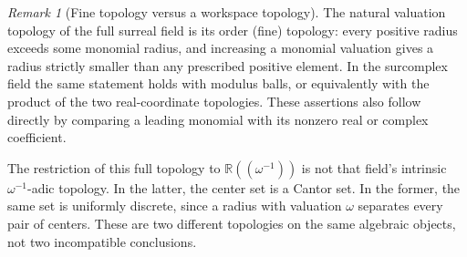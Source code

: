 \documentclass[11pt,a4paper]{article}
\numberwithin{equation}{section}
\theoremstyle{plain}
\theoremstyle{definition}
\theoremstyle{remark}
\newtheorem{remark}[remark]{Remark}
\newcommand{\R}{\mathbb R}
\begin{document}
\begin{remark}[Fine topology versus a workspace topology]\label{epd:rem:fine-vs-workspace}
The natural valuation topology of the full surreal field is its order
(fine) topology: every positive radius exceeds some monomial radius,
and increasing a monomial valuation gives a radius strictly smaller
than any prescribed positive element. In the surcomplex field the
same statement holds with modulus balls, or equivalently with the
product of the two real-coordinate topologies. These assertions also
follow directly by comparing a leading monomial with its nonzero real
or complex coefficient.

The restriction of this full topology to $\R((\omega^{-1}))$ is not
that field's intrinsic $\omega^{-1}$-adic topology. In the latter, the
center set is a Cantor set. In the former, the same set is uniformly
discrete, since a radius with valuation $\omega$ separates every pair
of centers. These are two different topologies on the same algebraic
objects, not two incompatible conclusions.
\end{remark}
\end{document}
